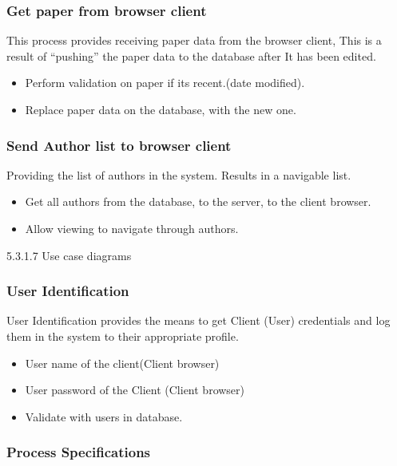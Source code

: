 \documentclass[hidelinks,a4paper,12pt]{article}
\begin{document}
		\subsubsection{Get paper from browser client}
	
	This process provides receiving paper data from the browser client,
	This is a result of “pushing” the paper data to the database after    
	It has been edited. 
	
		\begin{itemize}
			\item Perform validation on paper if its recent.(date modified).
			\item Replace paper data on the database, with the new one.
		\end{itemize}
	
	
	\subsubsection{Send Author list to browser client}
	
	Providing the list of authors in the system. Results in a navigable
	list.		
	
	\begin{itemize}
		\item Get all authors from the database, to the server, to the client browser.
		\item Allow viewing to navigate through authors.
	\end{itemize}
	
	5.3.1.7 Use case diagrams
	 
	
		\subsubsection{User Identification}
	
	User Identification provides the means to get Client (User) credentials and log them in the system to their appropriate profile. 
	
	\begin{itemize}
		\item User name of the client(Client browser)
		\item User password of the Client (Client browser)
		\item Validate with users in database. 
	\end{itemize}
	
	\subsubsection{Process Specifications}
	
\end{document}
